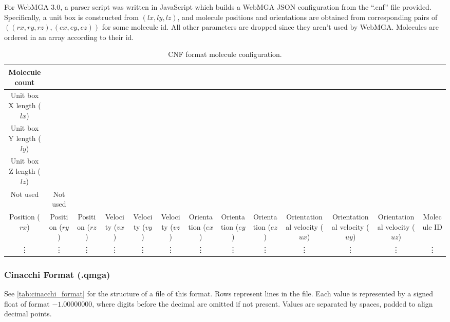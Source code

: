 For WebMGA 3.0, a parser script was written in JavaScript which builds a WebMGA JSON configuration from the ``.cnf'' file provided. Specifically, a unit box is constructed from $(lx, ly, lz)$, and molecule positions and orientations are obtained from corresponding pairs of $((rx,ry,rz),(ex,ey,ez))$ for some molecule id. All other parameters are dropped since they aren't used by WebMGA. Molecules are ordered in an array according to their id.
\begin{table}
  \begin{center}
  \begin{adjustbox}{width=\textwidth}
    \begin{tabular}{|c|c|c|c|c|c|c|c|c|c|c|c|c|}
      \hline
      Molecule count & & & & & & & & & & & &\\
      \hline
      Unit box X length ($lx$) & & & & & & & & & & & &\\
      \hline
      Unit box Y length ($ly$) & & & & & & & & & & & &\\
      \hline
      Unit box Z length ($lz$) & & & & & & & & & & & &\\
      \hline
      Not used & Not used & & & & & & & & & & &\\
      \hline
      Position ($rx$) & Position ($ry$) & Position ($rz$) & Velocity ($vx$) & Velocity ($vy$) & Velocity ($vz$) & Orientation ($ex$) & Orientation ($ey$) & Orientation ($ez$) & Orientational velocity ($ux$) & Orientational velocity ($uy$) & Orientational velocity ($uz$) & Molecule ID\\
      \hline
      \vdots & \vdots & \vdots & \vdots & \vdots & \vdots & \vdots & \vdots & \vdots & \vdots & \vdots & \vdots & \vdots \\
       \hline
    \end{tabular}
  \end{adjustbox}
  \end{center}
  \caption{CNF format molecule configuration.}
  \label{tab:lammps_format}
\end{table}

\subsubsection{Cinacchi Format (.qmga)}
See \cref{tab:cinacchi_format} for the structure of a file of this format. Rows represent lines in the file. Each value is represented by a signed float of format $-1.00000000$, where digits before the decimal are omitted if not present. Values are separated by spaces, padded to align decimal points.

